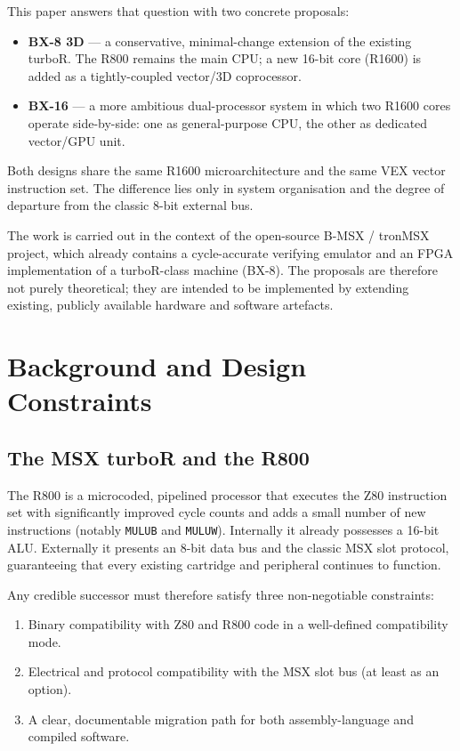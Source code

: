 \documentclass[11pt,a4paper]{article}
\begin{document}
This paper answers that question with two concrete proposals:

\begin{itemize}
    \item \textbf{BX-8 3D} --- a conservative, minimal-change extension of the existing turboR. The R800 remains the main CPU; a new 16-bit core (R1600) is added as a tightly-coupled vector/3D coprocessor.
    \item \textbf{BX-16} --- a more ambitious dual-processor system in which two R1600 cores operate side-by-side: one as general-purpose CPU, the other as dedicated vector/GPU unit.
\end{itemize}

Both designs share the same R1600 microarchitecture and the same VEX vector instruction set. The difference lies only in system organisation and the degree of departure from the classic 8-bit external bus.

The work is carried out in the context of the open-source B-MSX / tronMSX project, which already contains a cycle-accurate verifying emulator and an FPGA implementation of a turboR-class machine (BX-8). The proposals are therefore not purely theoretical; they are intended to be implemented by extending existing, publicly available hardware and software artefacts.

\section{Background and Design Constraints}

\subsection{The MSX turboR and the R800}

The R800 is a microcoded, pipelined processor that executes the Z80 instruction set with significantly improved cycle counts and adds a small number of new instructions (notably \texttt{MULUB} and \texttt{MULUW}). Internally it already possesses a 16-bit ALU. Externally it presents an 8-bit data bus and the classic MSX slot protocol, guaranteeing that every existing cartridge and peripheral continues to function.

Any credible successor must therefore satisfy three non-negotiable constraints:

\begin{enumerate}
    \item Binary compatibility with Z80 and R800 code in a well-defined compatibility mode.
    \item Electrical and protocol compatibility with the MSX slot bus (at least as an option).
    \item A clear, documentable migration path for both assembly-language and compiled software.
\end{enumerate}
\end{document}
